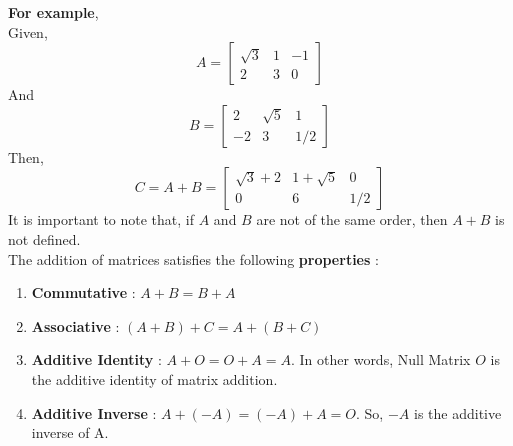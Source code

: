 \documentclass[12pt, letterpaper]{article}
\begin{document}
\textbf{For example},\\
Given, 
\begin{displaymath}
A = \begin{bmatrix}
\sqrt{3} & 1 & -1\\
2 & 3 & 0
\end{bmatrix}
\end{displaymath} 
And 
\begin{displaymath}
B = \begin{bmatrix}
2 & \sqrt{5} & 1\\
-2 & 3 & 1/2
\end{bmatrix}
\end{displaymath}
Then,
\begin{displaymath}
C = A + B = \begin{bmatrix}
\sqrt{3}+2 & 1+\sqrt{5} & 0\\
0 & 6 & 1/2
\end{bmatrix}
\end{displaymath}
It is important to note that, if $A$ and $B$ are not of the same order, then $A+B$ is not defined.\\
The addition of matrices satisfies the following \textbf{properties} :
\begin{enumerate}
    \item \textbf{Commutative} : $A+B = B+A$
    \item \textbf{Associative} : $(A+B)+C = A+(B+C)$
    \item \textbf{Additive Identity} : $A+O = O+A = A$. In other words, Null Matrix $O$ is the additive identity of matrix addition. 
    \item \textbf{Additive Inverse} : $A + (-A) = (-A) + A = O$. So, $-A$ is the additive inverse of A.
\end{enumerate}
\end{document}
